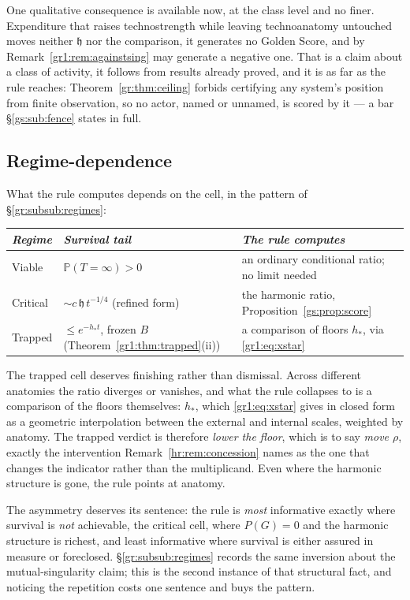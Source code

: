 \documentclass[11pt]{article}
\numberwithin{equation}{section}
\theoremstyle{plain}
\theoremstyle{definition}
\theoremstyle{remark}
\newcommand{\PP}{\mathbb{P}}
\newcommand{\hm}{\mathfrak{h}}
\begin{document}
One qualitative consequence is available now, at the class level and no finer. Expenditure that raises technostrength while leaving technoanatomy untouched moves neither $\hm$ nor the comparison, it generates no Golden Score, and by Remark~\ref{gr1:rem:againstsing} may generate a negative one. That is a claim about a class of activity, it follows from results already proved, and it is as far as the rule reaches: Theorem~\ref{gr:thm:ceiling} forbids certifying any system's position from finite observation, so no actor, named or unnamed, is scored by it --- a bar \S\ref{gs:sub:fence} states in full.

\subsection{Regime-dependence}\label{gs:sub:regimes}

What the rule computes depends on the cell, in the pattern of \S\ref{gr:subsub:regimes}:

\begin{center}\small
\begin{tabular}{@{}lll@{}}
\toprule
\emph{Regime} & \emph{Survival tail} & \emph{The rule computes} \\
\midrule
Viable & $\PP(T = \infty) > 0$ & an ordinary conditional ratio; no limit needed \\
Critical & $\sim c\,\hm\,t^{-1/4}$ (refined form) & the harmonic ratio, Proposition~\ref{gs:prop:score} \\
Trapped & $\le e^{-h_\ast t}$, frozen $B$ (Theorem~\ref{gr1:thm:trapped}(ii)) & a comparison of floors $h_\ast$, via \eqref{gr1:eq:xstar} \\
\bottomrule
\end{tabular}
\end{center}

The trapped cell deserves finishing rather than dismissal. Across different anatomies the ratio diverges or vanishes, and what the rule collapses to is a comparison of the floors themselves: $h_\ast$, which \eqref{gr1:eq:xstar} gives in closed form as a geometric interpolation between the external and internal scales, weighted by anatomy. The trapped verdict is therefore \emph{lower the floor}, which is to say \emph{move $\rho$}, exactly the intervention Remark~\ref{hr:rem:concession} names as the one that changes the indicator rather than the multiplicand. Even where the harmonic structure is gone, the rule points at anatomy.

The asymmetry deserves its sentence: the rule is \emph{most} informative exactly where survival is \emph{not} achievable, the critical cell, where $P(G) = 0$ and the harmonic structure is richest, and least informative where survival is either assured in measure or foreclosed. \S\ref{gr:subsub:regimes} records the same inversion about the mutual-singularity claim; this is the second instance of that structural fact, and noticing the repetition costs one sentence and buys the pattern.
\end{document}

